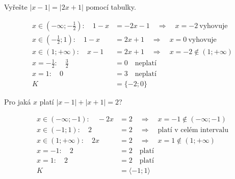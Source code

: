\documentclass[11pt,a4paper]{article}
\begin{document}
\begin{prikladReseniBox}[title={Příklad 2}]
Vyřešte $|x-1|=|2x+1|$ pomocí tabulky.
\tcblower
\begin{center}
\begingroup\footnotesize
\renewcommand{\arraystretch}{1.32}
\endgroup
\end{center}
\[\begin{aligned}x\in (-\infty;- \frac{1}{2}):\quad 1 - x &= - 2 x - 1\quad\Longrightarrow\quad x=-2\ \text{vyhovuje}\\[2pt]
x\in (- \frac{1}{2};1):\quad 1 - x &= 2 x + 1\quad\Longrightarrow\quad x=0\ \text{vyhovuje}\\[2pt]
x\in (1;+\infty):\quad x - 1 &= 2 x + 1\quad\Longrightarrow\quad x=-2\notin (1;+\infty)\\[2pt]
x=- \frac{1}{2}:\quad \frac{3}{2} &= 0\quad\text{neplatí}\\[2pt]
x=1:\quad 0 &= 3\quad\text{neplatí}\\[2pt]
K&=\{-2;0\}\end{aligned}\]
\end{prikladReseniBox}
\begin{prikladReseniBox}[title={Příklad 3}]
Pro jaká $x$ platí $|x-1|+|x+1|=2$?
\tcblower
\begin{center}
\begingroup\footnotesize
\renewcommand{\arraystretch}{1.32}
\endgroup
\end{center}
\[\begin{aligned}x\in (-\infty;-1):\quad - 2 x &= 2\quad\Longrightarrow\quad x=-1\notin (-\infty;-1)\\[2pt]
x\in (-1;1):\quad 2 &= 2\quad\Longrightarrow\quad \text{platí v celém intervalu}\\[2pt]
x\in (1;+\infty):\quad 2 x &= 2\quad\Longrightarrow\quad x=1\notin (1;+\infty)\\[2pt]
x=-1:\quad 2 &= 2\quad\text{platí}\\[2pt]
x=1:\quad 2 &= 2\quad\text{platí}\\[2pt]
K&=\langle-1;1\rangle\end{aligned}\]
\end{prikladReseniBox}
\end{document}
